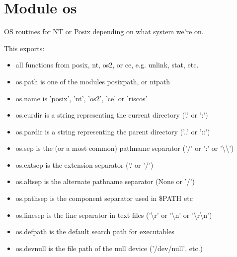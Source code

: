 %
%
%


\section{Module os}

    \label{os}
OS routines for NT or Posix depending on what system we're on.

This exports:

\begin{itemize}
\setlength{\parskip}{0.6ex}
  \item all functions from posix, nt, os2, or ce, e.g. unlink, stat, etc.

  \item os.path is one of the modules posixpath, or ntpath

  \item os.name is 'posix', 'nt', 'os2', 'ce' or 'riscos'

  \item os.curdir is a string representing the current directory ('.' or ':')

  \item os.pardir is a string representing the parent directory ('..' or '::')

  \item os.sep is the (or a most common) pathname separator ('/' or ':' or 
    '{\textbackslash}{\textbackslash}')

  \item os.extsep is the extension separator ('.' or '/')

  \item os.altsep is the alternate pathname separator (None or '/')

  \item os.pathsep is the component separator used in \$PATH etc

  \item os.linesep is the line separator in text files ('{\textbackslash}r' or 
    '{\textbackslash}n' or '{\textbackslash}r{\textbackslash}n')

  \item os.defpath is the default search path for executables

  \item os.devnull is the file path of the null device ('/dev/null', etc.)

\end{itemize}


